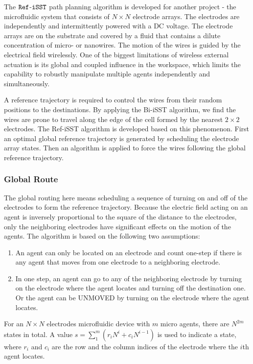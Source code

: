 \documentclass[conference, onecolumn]{IEEEtran}
\begin{document}
The $\tt Ref$-$\tt iSST$ path planning algorithm is developed for another project - the microfluidic system that consists of $N \times N$ electrode arrays. The electrodes are independently and intermittently powered with a DC voltage. The electrode arrays are on the substrate and covered by a fluid that contains a dilute concentration of micro- or nanowires. The motion of the wires is guided by the electrical field wirelessly. One of the biggest limitations of wireless external actuation is its global and coupled influence in the workspace, which limits the capability to robustly manipulate multiple agents independently and simultaneously.

A reference trajectory is required to control the wires from their random positions to the destinations. By applying the Bi-iSST algorithm, we find the wires are prone to travel along the edge of the cell formed by the nearest $2 \times 2$ electrodes. The Ref-iSST algorithm is developed based on this phenomenon. First an optimal global reference trajectory is generated by scheduling the electrode array states. Then an algorithm is applied to force the wires following the global reference trajectory. 

\subsubsection{Global Route}
The global routing here means scheduling a sequence of
turning on and off of the electrodes to form the reference trajectory. Because the electric field acting on an agent is inversely proportional to the square of the distance to the electrodes, only the neighboring electrodes have significant effects on the motion of the agents. The algorithm is based on the following two assumptions:
\begin{enumerate}	
	\item An agent can only be located on an electrode and count one-step if there is any agent	that moves from one electrode to a neighboring electrode.
	\item In one step, an agent can go to any of the neighboring electrode by turning on the electrode where the agent locates and turning off the destination one. Or the agent can be UNMOVED by turning on the electrode where the agent locates.
\end{enumerate}
For an $N \times N$ electrodes microfluidic device with $m$ micro agents, there are $N^{2m}$ states in total. A value $s = \sum_{1}^{m}(r_iN^i+c_iN^{i-1})$ is used to indicate a state, where $r_i$ and $c_i$ are the row and the column indices of the electrode where the $i$th agent locates. 
\end{document}
